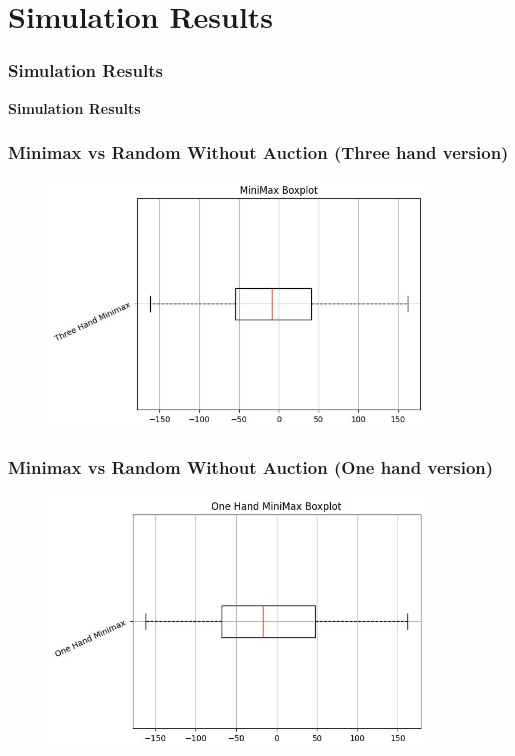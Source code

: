 \documentclass{beamer}
\begin{document}
\section{Simulation Results}
\begin{frame}\frametitle{Simulation Results}
\begin{center}
    \textbf{Simulation Results}
\end{center}
\end{frame}


\begin{frame}\frametitle{Minimax vs Random Without Auction (Three hand version)}
\begin{center}
        \begin{figure}
	    \includegraphics[width=10cm]{ThreeHandMinimax.png}
        \end{figure}
\end{center}
\end{frame}

\begin{frame}\frametitle{Minimax vs Random Without Auction (One hand version)}
\begin{center}
        \begin{figure}
	    \includegraphics[width=10cm]{OneHandMinimax.png}
        \end{figure}
\end{center}
\end{frame}
\end{document}

